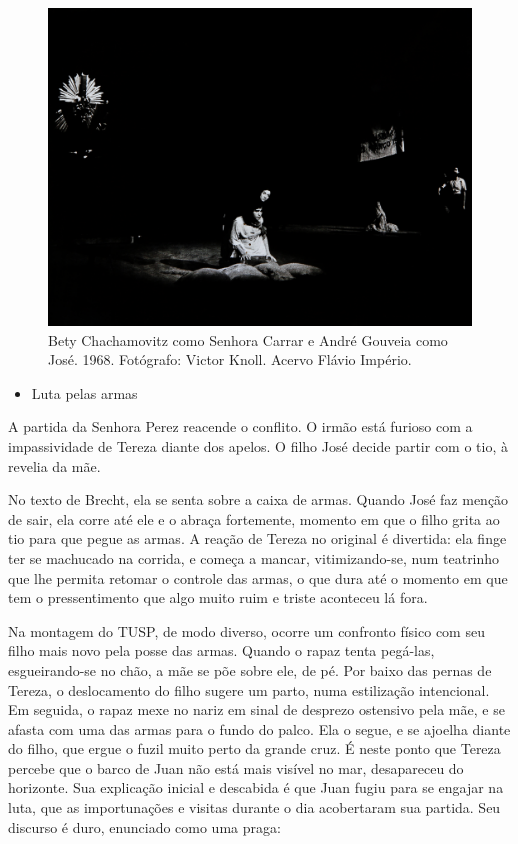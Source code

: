 \begin{figure}
\includegraphics[width=\columnwidth]{./media/IMAGEM51.png}
\caption{Bety Chachamovitz como Senhora Carrar e André Gouveia como José. 1968.
Fotógrafo: Victor Knoll. Acervo Flávio Império.}
\end{figure}

\begin{itemize}
\item
  Luta pelas armas
\end{itemize}

A partida da Senhora Perez reacende o conflito. O irmão está furioso com
a impassividade de Tereza diante dos apelos. O filho José decide partir
com o tio, à revelia da mãe.

No texto de Brecht, ela se senta sobre a caixa de armas. Quando José faz
menção de sair, ela corre até ele e o abraça fortemente, momento em que
o filho grita ao tio para que pegue as armas. A reação de Tereza no
original é divertida: ela finge ter se machucado na corrida, e começa a
mancar, vitimizando-se, num teatrinho que lhe permita retomar o controle
das armas, o que dura até o momento em que tem o pressentimento que algo
muito ruim e triste aconteceu lá fora.

Na montagem do TUSP, de modo diverso, ocorre um confronto físico com seu
filho mais novo pela posse das armas. Quando o rapaz tenta pegá-las,
esgueirando-se no chão, a mãe se põe sobre ele, de pé. Por baixo das
pernas de Tereza, o deslocamento do filho sugere um parto, numa
estilização intencional. Em seguida, o rapaz mexe no nariz em sinal de
desprezo ostensivo pela mãe, e se afasta com uma das armas para o fundo
do palco. Ela o segue, e se ajoelha diante do filho, que ergue o fuzil
muito perto da grande cruz. É neste ponto que Tereza percebe que o barco
de Juan não está mais visível no mar, desapareceu do horizonte. Sua
explicação inicial e descabida é que Juan fugiu para se engajar na luta,
que as importunações e visitas durante o dia acobertaram sua partida.
Seu discurso é duro, enunciado como uma praga:


